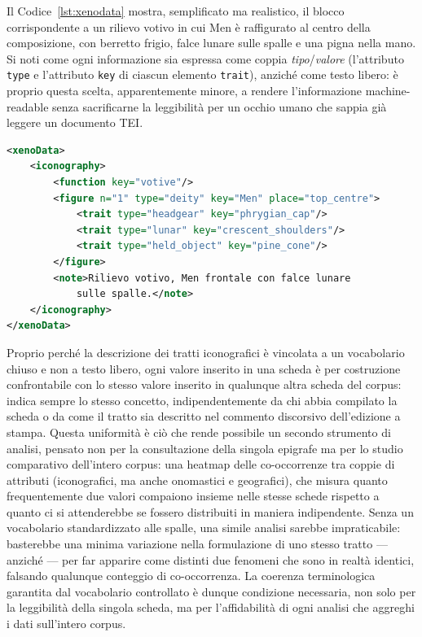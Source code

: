 \documentclass[11pt,a4paper]{article}
\begin{document}
Il Codice~\ref{lst:xenodata} mostra, semplificato ma realistico, il
blocco corrispondente a un rilievo votivo in cui Men è raffigurato al
centro della composizione, con berretto frigio, falce lunare sulle
spalle e una pigna nella mano. Si noti come ogni informazione sia
espressa come coppia \emph{tipo}/\emph{valore} (l'attributo
\texttt{type} e l'attributo \texttt{key} di ciascun elemento
\texttt{trait}), anziché come testo libero: è proprio questa scelta,
apparentemente minore, a rendere l'informazione machine-readable senza
sacrificarne la leggibilità per un occhio umano che sappia già leggere
un documento TEI.

\begin{lstlisting}[language=XML, caption={Blocco \texttt{xenoData} di
esempio per un rilievo votivo con Men frontale}, label={lst:xenodata}]
<xenoData>
    <iconography>
        <function key="votive"/>
        <figure n="1" type="deity" key="Men" place="top_centre">
            <trait type="headgear" key="phrygian_cap"/>
            <trait type="lunar" key="crescent_shoulders"/>
            <trait type="held_object" key="pine_cone"/>
        </figure>
        <note>Rilievo votivo, Men frontale con falce lunare
            sulle spalle.</note>
    </iconography>
</xenoData>
\end{lstlisting}

Proprio perché la descrizione dei tratti iconografici è vincolata a un
vocabolario chiuso e non a testo libero, ogni valore inserito in una
scheda è per costruzione confrontabile con lo stesso valore inserito in
qualunque altra scheda del corpus:  indica
sempre lo stesso concetto, indipendentemente da chi abbia compilato la
scheda o da come il tratto sia descritto nel commento discorsivo
dell'edizione a stampa. Questa uniformità è ciò che rende possibile un
secondo strumento di analisi, pensato non per la consultazione della
singola epigrafe ma per lo studio comparativo dell'intero corpus: una
heatmap delle co-occorrenze tra coppie di attributi (iconografici, ma
anche onomastici e geografici), che misura quanto frequentemente due
valori compaiono insieme nelle stesse schede rispetto a quanto ci si
attenderebbe se fossero distribuiti in maniera indipendente. Senza un
vocabolario standardizzato alle spalle, una simile analisi sarebbe
impraticabile: basterebbe una minima variazione nella formulazione di
uno stesso tratto ---  anziché  --- per far apparire come distinti due fenomeni che sono in
realtà identici, falsando qualunque conteggio di co-occorrenza. La
coerenza terminologica garantita dal vocabolario controllato è dunque
condizione necessaria, non solo per la leggibilità della singola scheda,
ma per l'affidabilità di ogni analisi che aggreghi i dati sull'intero
corpus.
\end{document}
